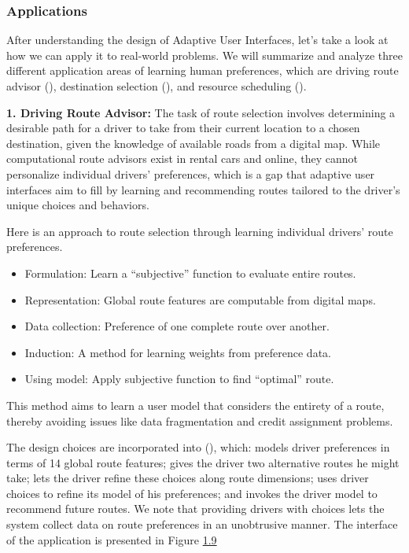 \documentclass[
  letterpaper,
  DIV=11,
  numbers=noendperiod,
  oneside]{scrreprt}
\theoremstyle{remark}
\begin{document}
\subsubsection{Applications}\label{applications-1}

After understanding the design of Adaptive User Interfaces, let's take a
look at how we can apply it to real-world problems. We will summarize
and analyze three different application areas of learning human
preferences, which are driving route advisor
(),
destination selection (), and resource scheduling
().

\textbf{1. Driving Route Advisor:} The task of route selection involves
determining a desirable path for a driver to take from their current
location to a chosen destination, given the knowledge of available roads
from a digital map. While computational route advisors exist in rental
cars and online, they cannot personalize individual drivers'
preferences, which is a gap that adaptive user interfaces aim to fill by
learning and recommending routes tailored to the driver's unique choices
and behaviors.

Here is an approach to route selection through learning individual
drivers' route preferences.

\begin{itemize}
\item
  Formulation: Learn a ``subjective'' function to evaluate entire
  routes.
\item
  Representation: Global route features are computable from digital
  maps.
\item
  Data collection: Preference of one complete route over another.
\item
  Induction: A method for learning weights from preference data.
\item
  Using model: Apply subjective function to find ``optimal'' route.
\end{itemize}

This method aims to learn a user model that considers the entirety of a
route, thereby avoiding issues like data fragmentation and credit
assignment problems.

The design choices are incorporated into
(),
which: models driver preferences in terms of 14 global route features;
gives the driver two alternative routes he might take; lets the driver
refine these choices along route dimensions; uses driver choices to
refine its model of his preferences; and invokes the driver model to
recommend future routes. We note that providing drivers with choices
lets the system collect data on route preferences in an unobtrusive
manner. The interface of the application is presented in Figure
\hyperref[fig:exp-1]{1.9}
\end{document}
